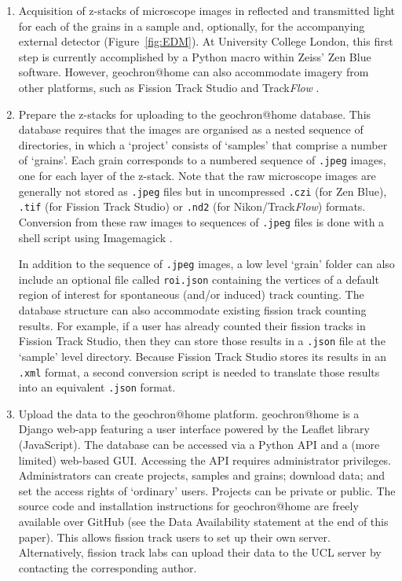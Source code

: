 \documentclass[gchron, manuscript]{copernicus}
\begin{document}
\begin{enumerate}
\item Acquisition of z-stacks of microscope images in reflected and
  transmitted light for each of the grains in a sample and,
  optionally, for the accompanying external detector
  (Figure~\ref{fig:EDM}). At University College London, this first
  step is currently accomplished by a Python macro within Zeiss' Zen
  Blue software.  However, geochron@home can also accommodate imagery
  from other platforms, such as Fission Track Studio
  \citep[Zeiss;][]{gleadow2009} and Track\emph{Flow}
  \citep[Nikon;][]{vanranst2019}.

\item Prepare the z-stacks for uploading to the geochron@home
  database. This database requires that the images are organised as a
  nested sequence of directories, in which a `project' consists of
  `samples' that comprise a number of `grains'.  Each grain
  corresponds to a numbered sequence of \texttt{.jpeg} images, one for
  each layer of the z-stack. Note that the raw microscope images are
  generally not stored as \texttt{.jpeg} files but in uncompressed
  \texttt{.czi} (for Zen Blue), \texttt{.tif} (for Fission Track
  Studio) or \texttt{.nd2} (for Nikon/Track\emph{Flow})
  formats. Conversion from these raw images to sequences of
  \texttt{.jpeg} files is done with a shell script using Imagemagick
  \citep{still2006}.\medskip

  In addition to the sequence of \texttt{.jpeg} images, a low level
  `grain' folder can also include an optional file called
  \texttt{roi.json} containing the vertices of a default region of
  interest for spontaneous (and/or induced) track counting. The
  database structure can also accommodate existing fission track
  counting results.  For example, if a user has already counted their
  fission tracks in Fission Track Studio, then they can store those
  results in a \texttt{.json} file at the `sample' level
  directory. Because Fission Track Studio stores its results in an
  \texttt{.xml} format, a second conversion script is needed to
  translate those results into an equivalent \texttt{.json} format.

\item Upload the data to the geochron@home platform. geochron@home is
  a Django web-app featuring a user interface powered by the Leaflet
  library (JavaScript).  The database can be accessed via a Python API
  and a (more limited) web-based GUI. Accessing the API requires
  administrator privileges. Administrators can create projects,
  samples and grains; download data; and set the access rights of
  `ordinary' users.  Projects can be private or public. The source
  code and installation instructions for geochron@home are freely
  available over GitHub (see the Data Availability statement at the
  end of this paper). This allows fission track users to set up their
  own server. Alternatively, fission track labs can upload their data
  to the UCL server by contacting the corresponding author.


\end{enumerate}
\end{document}
